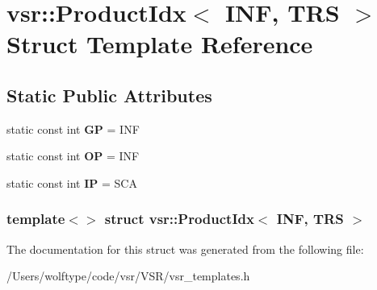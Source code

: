 \hypertarget{structvsr_1_1_product_idx_3_01_i_n_f_00_01_t_r_s_01_4}{\section{vsr\-:\-:Product\-Idx$<$ I\-N\-F, T\-R\-S $>$ Struct Template Reference}
\label{structvsr_1_1_product_idx_3_01_i_n_f_00_01_t_r_s_01_4}
}
\subsection*{Static Public Attributes}
\begin{DoxyCompactItemize}
\item 
\hypertarget{structvsr_1_1_product_idx_3_01_i_n_f_00_01_t_r_s_01_4_ac1c784348e31b552eb6fb9c805995a6d}{static const int {\bfseries G\-P} = I\-N\-F}\label{structvsr_1_1_product_idx_3_01_i_n_f_00_01_t_r_s_01_4_ac1c784348e31b552eb6fb9c805995a6d}

\item 
\hypertarget{structvsr_1_1_product_idx_3_01_i_n_f_00_01_t_r_s_01_4_ab88fdac04eab710d49c7bad0a8552fa7}{static const int {\bfseries O\-P} = I\-N\-F}\label{structvsr_1_1_product_idx_3_01_i_n_f_00_01_t_r_s_01_4_ab88fdac04eab710d49c7bad0a8552fa7}

\item 
\hypertarget{structvsr_1_1_product_idx_3_01_i_n_f_00_01_t_r_s_01_4_af689e314713efd4dae271b7cbe947b4a}{static const int {\bfseries I\-P} = S\-C\-A}\label{structvsr_1_1_product_idx_3_01_i_n_f_00_01_t_r_s_01_4_af689e314713efd4dae271b7cbe947b4a}

\end{DoxyCompactItemize}
\subsubsection*{template$<$$>$ struct vsr\-::\-Product\-Idx$<$ I\-N\-F, T\-R\-S $>$}



The documentation for this struct was generated from the following file\-:\begin{DoxyCompactItemize}
\item 
/\-Users/wolftype/code/vsr/\-V\-S\-R/vsr\-\_\-templates.\-h\end{DoxyCompactItemize}

